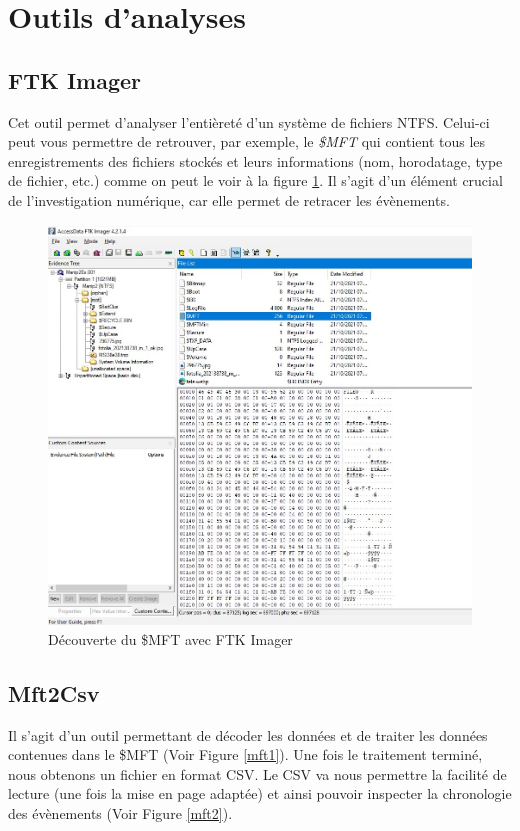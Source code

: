 \documentclass[a4paper]{article}
\begin{document}
\newpage
\section{Outils d'analyses}


\subsection{FTK Imager}

Cet outil permet d'analyser l'entièreté d'un système de fichiers NTFS. Celui-ci peut vous permettre de retrouver, par exemple, le \emph{\$MFT} qui contient tous les enregistrements des fichiers stockés et leurs informations (nom, horodatage, type de fichier, etc.) comme on peut le voir à la figure \ref{fig:ftk}. Il s'agit d'un élément crucial de l’investigation numérique, car elle permet de retracer les évènements.

\begin{figure}[H]
    \centering
    \includegraphics[width=0.99\linewidth]{images/ftk.jpg}
    \caption{Découverte du \$MFT avec FTK Imager}
    \label{fig:ftk}
\end{figure}

\subsection{Mft2Csv}
Il s'agit d'un outil permettant de décoder les données et de traiter les données contenues dans le \$MFT (Voir Figure \ref{mft1}). Une fois le traitement terminé, nous obtenons un fichier en format CSV. Le CSV va nous permettre la facilité de lecture (une fois la mise en page adaptée) et ainsi pouvoir inspecter la chronologie des évènements (Voir Figure \ref{mft2}).
\end{document}
